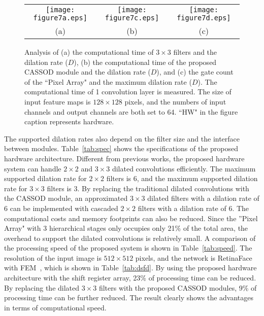 \documentclass[10pt,twocolumn,letterpaper]{article}
\begin{document}
\begin{figure*}[t]
\begin{center}
\begin{tabular}{ccc}
\texttt{[image: figure7a.eps]} & \texttt{[image: figure7c.eps]} & \texttt{[image: figure7d.eps]} \\
(a) & (b) & (c)\\
\end{tabular}   
\end{center}
   \caption{Analysis of (a) the computational time of $3 \times 3$ filters and the dilation rate ($D$), (b) the computational time of the proposed CASSOD module and the dilation rate ($D$), and (c) the gate count of the ``Pixel Array" and the maximum dilation rate ($D$). The computational time of 1 convolution layer is measured. The size of input feature maps is $128 \times 128$ pixels, and the numbers of input channels and output channels are both set to 64. ``HW" in the figure caption represents hardware.}
\label{fig:hardware}
\end{figure*}

The supported dilation rates also depend on the filter size and the interface between modules. Table~\ref{tab:spec} shows the specifications of the proposed hardware architecture. Different from previous works, the proposed hardware system can handle $2 \times 2$ and $3 \times 3$ dilated convolutions efficiently. The maximum supported dilation rate for $2 \times 2$ filters is 6, and the maximum supported dilation rate for $3 \times 3$ filters is 3. By replacing the traditional dilated convolutions with the CASSOD module, an approximated $3 \times 3$ dilated filters with a dilation rate of 6 can be implemented with cascaded $2 \times 2$ filters with a dilation rate of 6. The computational costs and memory footprints can also be reduced. Since the ''Pixel Array" with 3 hierarchical stages only occupies only 21\% of the total area, the overhead to support the dilated convolutions is relatively small. A comparison of the processing speed of the proposed system is shown in Table~\ref{tab:speed}. The resolution of the input image is $512 \times 512$ pixels, and the network is RetinaFace~\cite{Deng19} with FEM~\cite{Li18_1}, which is shown in Table~\ref{tab:dsfd}. By using the proposed hardware architecture with the shift register array, 23\% of processing time can be reduced. By replacing the dilated $3 \times 3$ filters with the proposed CASSOD modules, 9\% of processing time can be further reduced. The result clearly shows the advantages in terms of computational speed.
\end{document}

